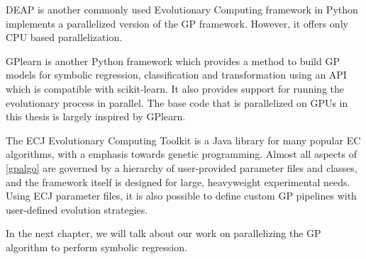 DEAP \citep{DEAP_JMLR2012} is another commonly used Evolutionary Computing framework in Python implements a parallelized version of the GP framework. However, it offers only CPU based parallelization. 

GPlearn\citep{gplearn} is another Python framework which provides a method to build GP models for symbolic regression, classification and transformation using an API which is compatible with scikit-learn\citep{scikit-learn}. It also provides support for running the evolutionary process in parallel. The base code that is parallelized on GPUs in this thesis is largely inspired by GPlearn. 

The ECJ Evolutionary Computing Toolkit\citep{Luke1998ECJSoftware} is a Java library for many popular EC algorithms, with a emphasis towards genetic programming. Almost all aspects of \cref{gpalgo} are governed by a hierarchy of user-provided parameter files and classes, and the framework itself is designed for large, heavyweight experimental needs. Using ECJ parameter files, it is also possible to define custom GP pipelines with user-defined evolution strategies.

In the next chapter, we will talk about our work on parallelizing the GP algorithm to perform symbolic regression.
